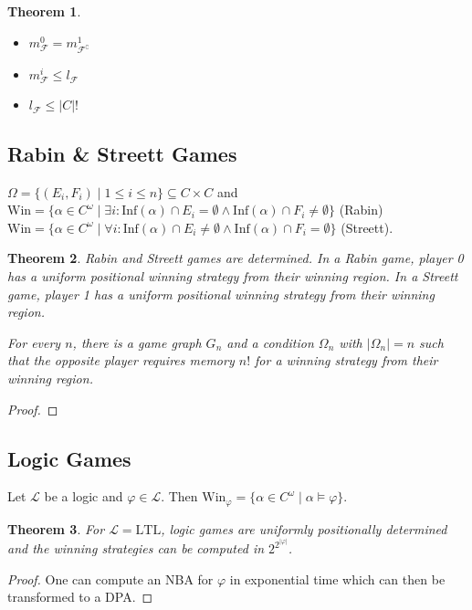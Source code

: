 \documentclass{article}
\newtheorem{theorem}{Theorem}
\begin{document}
\begin{theorem}
\begin{itemize}
	\item $m^0_\mathcal{F} = m^1_{\mathcal{F}^\complement}$
	\item $m^i_\mathcal{F} \leq l_\mathcal{F}$
	\item $l_\mathcal{F} \leq |C|!$
\end{itemize}
\end{theorem}

\subsection{Rabin \& Streett Games}
$\Omega = \{(E_i, F_i) \mid 1 \leq i \leq n\} \subseteq C \times C$ and \\
$\text{Win} = \{ \alpha \in C^\omega \mid \exists i: \text{Inf}(\alpha) \cap E_i = \emptyset \land \text{Inf}(\alpha) \cap F_i \neq \emptyset \}$ (Rabin) \\
$\text{Win} = \{ \alpha \in C^\omega \mid \forall i: \text{Inf}(\alpha) \cap E_i \neq \emptyset \land \text{Inf}(\alpha) \cap F_i = \emptyset \}$ (Streett).

\begin{theorem}
	Rabin and Streett games are determined. In a Rabin game, player 0 has a uniform positional winning strategy from their winning region. In a Streett game, player 1 has a uniform positional winning strategy from their winning region. 
	
	For every $n$, there is a game graph $G_n$ and a condition $\Omega_n$ with $|\Omega_n| = n$ such that the opposite player requires memory $n!$ for a winning strategy from their winning region.
\end{theorem}
\begin{proof}
\end{proof}

\subsection{Logic Games}
Let $\mathcal{L}$ be a logic and $\varphi \in \mathcal{L}$. Then $\text{Win}_\varphi = \{ \alpha \in C^\omega \mid \alpha \models \varphi \}$.

\begin{theorem}
	For $\mathcal{L} = \text{LTL}$, logic games are uniformly positionally determined and the winning strategies can be computed in $2^{2^{|\varphi|}}$.
\end{theorem}
\begin{proof}
	One can compute an NBA for $\varphi$ in exponential time which can then be transformed to a DPA.
\end{proof}
\end{document}
